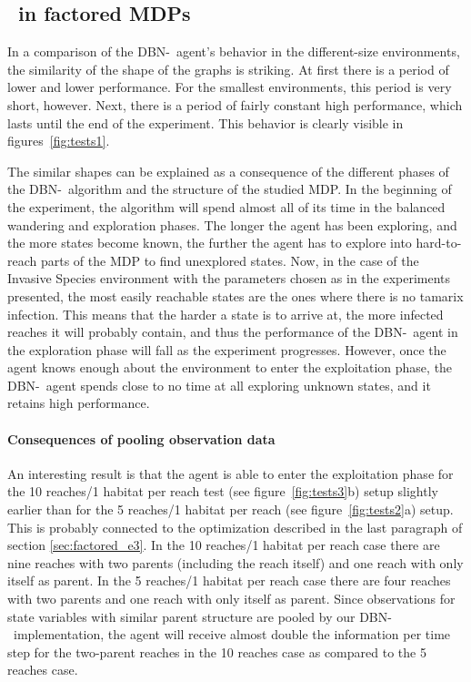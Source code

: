 \subsection{\etre\ in factored MDPs}
\label{sec:e3_factored_discussion}

In a comparison of the DBN-\etre\ agent's behavior in the different-size environments, the similarity of the shape of the graphs is striking. At first there is a period of lower and lower performance. For the smallest environments, this period is very short, however. Next, there is a period of fairly constant high performance, which lasts until the end of the experiment. This behavior is clearly visible in figures~\ref{fig:tests1}.   

The similar shapes can be explained as a consequence of the different phases  of the DBN-\etre\ algorithm and the structure of the studied MDP. In the beginning of the experiment, the algorithm will spend almost all of its time in the balanced wandering and exploration phases. The longer the agent has been exploring, and the more states become known, the further the agent has to explore into hard-to-reach parts of the MDP to find unexplored states. Now, in the case of the Invasive Species environment with the parameters chosen as in the experiments presented, the most easily reachable states are the ones where there is no tamarix infection. This means that the harder a state is to arrive at, the more infected reaches it will probably contain, and thus the performance of the DBN-\etre\ agent in the exploration phase will fall as the experiment progresses. However, once the agent knows enough about the environment to enter the exploitation phase, the DBN-\etre\ agent spends close to no time at all exploring unknown states, and it retains high performance. 

\paragraph{Consequences of pooling observation data} An interesting result is that the agent is able to enter the exploitation phase for the 10 reaches/1 habitat per reach test (see figure~\ref{fig:tests3}b) setup slightly earlier than for the 5 reaches/1 habitat per reach (see figure~\ref{fig:tests2}a) setup. This is probably connected to the optimization described in the last paragraph of section \ref{sec:factored_e3}. In the 10 reaches/1 habitat per reach case there are nine reaches with two parents (including the reach itself) and one reach with only itself as parent. In the 5 reaches/1 habitat per reach case there are four reaches with two parents and one reach with only itself as parent. Since observations for state variables with similar parent structure are pooled by our DBN-\etre\ implementation, the agent will receive almost double the information per time step for the two-parent reaches in the 10 reaches case as compared to the 5 reaches case.  

